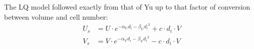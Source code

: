 \documentclass[12pt]{article}
\begin{document}
The LQ model followed exactly from that of Yu  up to that factor of conversion between volume and cell number: 
\begin{align*}
U_s &= U\cdot e^{-\alpha_{\text{U}}{d_i}-\beta_{\text{U}}{d_i}^2}+c\cdot d_i\cdot V\\
V_s &= V\cdot e^{-\alpha_{
\text{V}}{d_i}-\beta_{\text{V}}{d_i}^2} - c\cdot d_i\cdot V
\end{align*}
\end{document}
